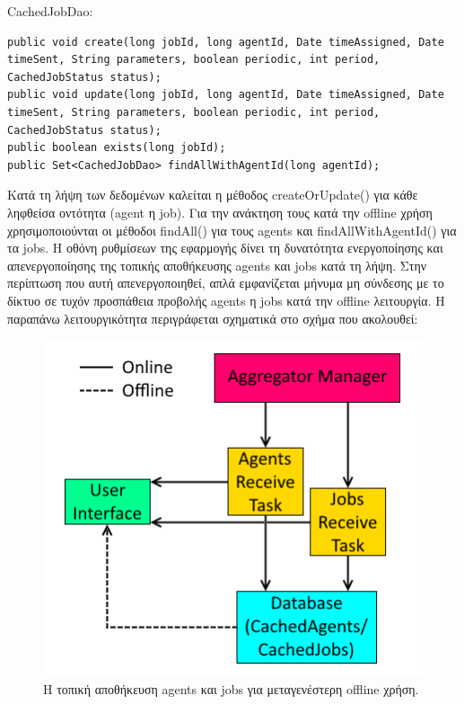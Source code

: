 \documentclass[a4paper,11pt]{article}
\begin{document}
\begin{sloppypar}
CachedJobDao:

\begin{lstlisting}
public void create(long jobId, long agentId, Date timeAssigned, Date timeSent, String parameters, boolean periodic, int period, CachedJobStatus status);
public void update(long jobId, long agentId, Date timeAssigned, Date timeSent, String parameters, boolean periodic, int period, CachedJobStatus status);
public boolean exists(long jobId);
public Set<CachedJobDao> findAllWithAgentId(long agentId);
\end{lstlisting}

Κατά τη λήψη των δεδομένων καλείται η μέθοδος createOrUpdate() για κάθε ληφθείσα οντότητα (agent η job). Για την ανάκτηση τους κατά την offline χρήση χρησιμοποιούνται οι μέθοδοι findAll() για τους agents και findAllWithAgentId() για τα jobs. Η οθόνη ρυθμίσεων της εφαρμογής δίνει τη δυνατότητα ενεργοποίησης και απενεργοποίησης της τοπικής αποθήκευσης agents και jobs κατά τη λήψη. Στην περίπτωση που αυτή απενεργοποιηθεί, απλά εμφανίζεται μήνυμα μη σύνδεσης με το δίκτυο σε τυχόν προσπάθεια προβολής agents η jobs κατά την offline λειτουργία. Η παραπάνω λειτουργικότητα περιγράφεται σχηματικά στο σχήμα που ακολουθεί:

\newpage

\begin{figure}[h]
\includegraphics[width=\textwidth]{caching-offline}
\centering
\caption{Η τοπική αποθήκευση agents και jobs για μεταγενέστερη offline χρήση.}
\end{figure}

\end{sloppypar}
\end{document}
